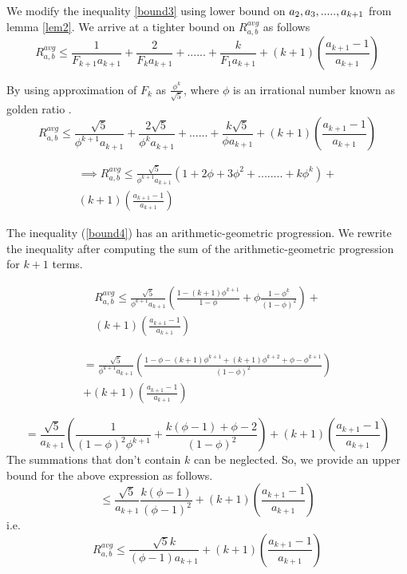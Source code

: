 \documentclass[pdflatex,sn-mathphys-num]{sn-jnl}%
\theoremstyle{thmstyleone}%
\theoremstyle{thmstyletwo}%
\theoremstyle{thmstylethree}%
\begin{document}
We modify the inequality \ref{bound3} using lower bound on $a_2,a_3,\\.....,a_{k+1}$ from lemma \ref{lem2}. We arrive at a tighter bound on $R_{a,b}^{avg} $ as follows
$$
R_{a,b}^{avg} \le  \frac{1}{F_{k+1}a_{k+1}}+\frac{2}{F_ka_{k+1}}+......+\frac{k}{F_1a_{k+1}}+(k+1)\left(\frac{a_{k+1}-1}{a_{k+1}}\right) 
$$

By using approximation of $F_k$ as $\frac{\phi^k}{\sqrt{5}}$, where $\phi$ is an irrational number known as golden ratio \cite{cormen2009introduction}.
$$
R_{a,b}^{avg} \le  \frac{\sqrt{5}}{\phi^{k+1}a_{k+1}}+\frac{2\sqrt{5}}{\phi^k a_{k+1}}+......+\frac{k\sqrt{5}}{\phi a_{k+1}}+(k+1)\left(\frac{a_{k+1}-1}{a_{k+1}}\right)   
$$

\begin{multline}    
 \label{bound4}
\implies R_{a,b}^{avg} \le \frac{\sqrt{5}}{\phi^{k+1}a_{k+1}}\left(1+2\phi+3\phi^2+........+k\phi^k\right)+\\(k+1)\left(\frac{a_{k+1}-1}{a_{k+1}}\right)  
\end{multline}

The inequality (\ref{bound4}) has an arithmetic-geometric progression. We rewrite the inequality after computing the sum of the arithmetic-geometric progression for $k+1$ terms.

\begin{multline}\label{bound 5}
    R_{a,b}^{avg} \le \frac{\sqrt{5}}{\phi^{k+1}a_{k+1}}\left(\frac{1-(k+1)\phi^{k+1}}{1-\phi}+\phi\frac{1-\phi^k}{(1-\phi)^2}\right)+\\(k+1)\left(\frac{a_{k+1}-1}{a_{k+1}}\right) 
\end{multline}

\begin{multline*}
=\frac{\sqrt{5}}{\phi^{k+1}a_{k+1}}\left(\frac{1-\phi-(k+1)\phi^{k+1}+(k+1)\phi^{k+2}+\phi-\phi^{k+1}}{(1-\phi)^2}\right) \\+(k+1)\left(\frac{a_{k+1}-1}{a_{k+1}}\right) 
\end{multline*}

$$
=\frac{\sqrt{5}}{a_{k+1}}\left(\frac{1}{(1-\phi)^2\phi^{k+1}}+\frac{k(\phi-1)+\phi-2}{(1-\phi)^2}\right)+(k+1)\left(\frac{a_{k+1}-1}{a_{k+1}}\right) 
$$
The summations that don't contain $k$ can be neglected.  So, we provide an upper bound for the above expression as follows.
$$
\le \frac{\sqrt{5}}{a_{k+1}}\frac{k(\phi-1)}{(\phi-1)^2}+ (k+1)\left(\frac{a_{k+1}-1}{a_{k+1}}\right) 
$$
i.e.
\begin{equation}\label{bound6}
    R_{a,b}^{avg}\le  \frac{\sqrt{5}k}{{(\phi-1)}a_{k+1}}+(k+1)\left(\frac{a_{k+1}-1}{a_{k+1}}\right) 
\end{equation}
\end{document}
